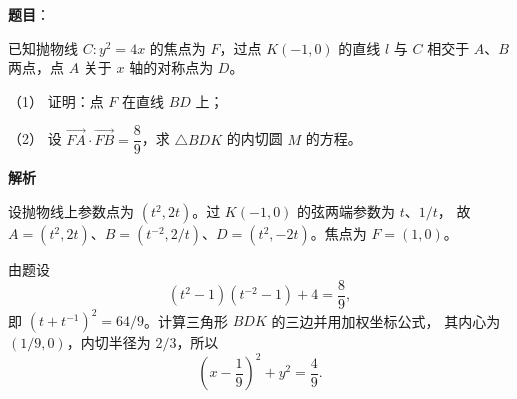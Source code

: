 \begin{answer}

\textbf{题目}：

已知抛物线 $C:y^2=4x$ 的焦点为 $F$，过点 $K(-1,0)$ 的直线 $l$ 与 $C$ 相交于 $A\text{、}B$ 两点，点 $A$ 关于 $x$ 轴的对称点为 $D$。

（1） 证明：点 $F$ 在直线 $BD$ 上；

（2） 设 $\overrightarrow{FA}\cdot\overrightarrow{FB}=\dfrac89$，求 $\triangle BDK$ 的内切圆 $M$ 的方程。

\textbf{解析}


设抛物线上参数点为 $(t^2,2t)$。过 $K(-1,0)$ 的弦两端参数为 $t$、$1/t$，
故 $A=(t^2,2t)$、$B=(t^{-2},2/t)$、$D=(t^2,-2t)$。焦点为 $F=(1,0)$。


由题设
\nopagebreak[4]
\[
(t^2-1)(t^{-2}-1)+4=\frac89,
\]
即 $(t+t^{-1})^2=64/9$。计算三角形 $BDK$ 的三边并用加权坐标公式，
其内心为 $(1/9,0)$，内切半径为 $2/3$，所以
\nopagebreak[4]
\[
\left(x-\frac19\right)^2+y^2=\frac49.
\]



\end{answer}